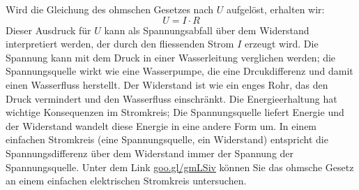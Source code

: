 \documentclass[11pt,twoside=false,open=any]{scrbook}
\begin{document}
Wird die Gleichung des ohmschen Gesetzes nach $U$ aufgelöst, erhalten wir:
\[ U = I \cdot R \]
Dieser Ausdruck für $U$ kann als Spannungsabfall über dem Widerstand interpretiert werden, der durch den fliessenden Strom $I$ erzeugt wird. Die Spannung kann mit dem Druck in einer Wasserleitung verglichen werden; die Spannungsquelle wirkt wie eine Wasserpumpe, die eine Drcukdifferenz und damit einen Wasserfluss herstellt. Der Widerstand ist wie ein enges Rohr, das den Druck vermindert und den Wasserfluss einschränkt. Die Energieerhaltung hat wichtige Konsequenzen im Stromkreis; Die Spannungsquelle liefert Energie und der Widerstand wandelt diese Energie in eine andere Form um. In einem einfachen Stromkreis (eine Spannungsquelle, ein Widerstand) entspricht die Spannungsdifferenz über dem Widerstand immer der Spannung der Spannungsquelle. Unter dem Link \href{https://phet.colorado.edu/sims/html/ohms-law/latest/ohms-law_de.html}{goo.gl/gmLSiv} können Sie das ohmsche Gesetz an einem einfachen elektrischen Stromkreis untersuchen.
\end{document}
